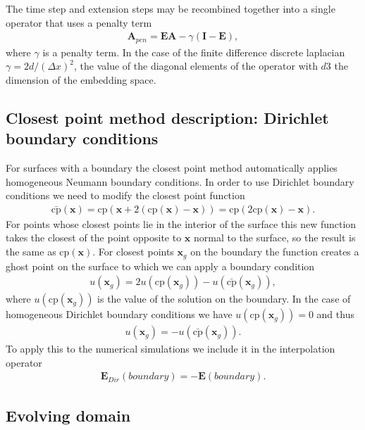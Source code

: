 \documentclass[fleqn,12pt]{siamart1116}
\begin{document}
The time step and extension steps may be recombined together into a single operator that uses a penalty term
\begin{align}
\mathbf{A}_{pen} = \mathbf{EA} - \gamma(\mathbf{I} - \mathbf{E}),
\end{align}
where $\gamma$ is a penalty term. In the case of the finite difference discrete laplacian $\gamma = 2d/(\Delta x)^2$, the value of the diagonal elements of the operator with $d$3 the dimension of the embedding space.

\subsection{Closest point method description: Dirichlet boundary conditions}
For surfaces with a boundary the closest point method automatically applies homogeneous Neumann boundary conditions. In order to use Dirichlet boundary conditions we need to modify the closest point function
\begin{align}
\bar{\text{cp}}(\mathbf{x}) = \text{cp} \left( \mathbf{x} + 2(\text{cp}(\mathbf{x}) - \mathbf{x}) \right) = \text{cp} \left( 2\text{cp}(\mathbf{x}) - \mathbf{x} \right).
\end{align}
For points whose closest points lie in the interior of the surface this new function takes the closest of the point opposite to $\mathbf{x}$ normal to the surface, so the result is the same as $\text{cp}(\mathbf{x})$. For closest points $\mathbf{x}_g$ on the boundary the function creates a ghost point on the surface to which we can apply a boundary condition
\begin{align}
u(\mathbf{x}_g) = 2u(\text{cp}(\mathbf{x}_g)) - u(\bar{\text{cp}}(\mathbf{x}_g)),
\end{align}
where $u(\text{cp}(\mathbf{x}_g))$ is the value of the solution on the boundary. In the case of homogeneous Dirichlet boundary conditions we have $u(\text{cp}(\mathbf{x}_g)) = 0$ and thus
\begin{align}
u(\mathbf{x}_g) = - u(\bar{\text{cp}}(\mathbf{x}_g)).
\end{align}
To apply this to the numerical simulations we include it in the interpolation operator
\begin{align}
\mathbf{E}_{Dir}(boundary) = - \mathbf{E}(boundary).
\end{align}

\subsection{Evolving domain}
\end{document}
